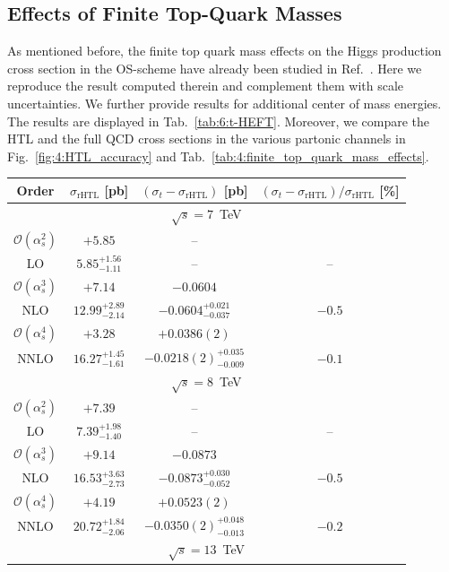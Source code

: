 \subsection{Effects of Finite Top-Quark Masses}
As mentioned before, the finite top quark mass effects on the Higgs production cross section in the \acs{OS}-scheme have already been studied in Ref.~\cite{Czakon:2021yub}. Here we reproduce the result computed therein and complement them with scale uncertainties. We further provide results for additional center of mass energies. The results are displayed in Tab.~\ref{tab:6:t-HEFT}. Moreover, we compare the \acs{HTL} and the full \acs{QCD} cross sections in the various partonic channels in Fig.~\ref{fig:4:HTL_accuracy} and Tab.~\ref{tab:4:finite_top_quark_mass_effects}.
\begin{table}[t]
\centering
\begin{tabular}{cccc}
Order  &  $\sigma_\text{rHTL}$ [pb] & $(\sigma_t - \sigma_\text{rHTL})$ [pb]  &  $(\sigma_t - \sigma_\text{rHTL})/\sigma_\text{rHTL}$ [\%]  \\
\hline
\hline
\multicolumn{4}{c}{$\sqrt{s}=7$~TeV}\\
\hline
$\mathcal{O}(\alpha_s^2)$ & $+5.85$ & -- &  \\
LO & $5.85^{+1.56}_{-1.11}$ & -- & --  \\
\hline
$\mathcal{O}(\alpha_s^3)$ & $+7.14$ & $-0.0604$ &  \\
NLO & $12.99^{+2.89}_{-2.14}$ & $-0.0604^{+0.021}_{-0.037}$ & $-0.5$  \\
\hline
$\mathcal{O}(\alpha_s^4)$ & $+3.28$ & $+0.0386(2)$ &  \\
NNLO & $16.27^{+1.45}_{-1.61}$ & $-0.0218(2)^{+0.035}_{-0.009}$ & $-0.1$  \\
\hline
\hline
\multicolumn{4}{c}{$\sqrt{s}=8$~TeV}\\
\hline
$\mathcal{O}(\alpha_s^2)$ & $+7.39$ & -- &  \\
LO & $7.39^{+1.98}_{-1.40}$ & -- & --  \\
\hline
$\mathcal{O}(\alpha_s^3)$ & $+9.14$ & $-0.0873$ &  \\
NLO & $16.53^{+3.63}_{-2.73}$ & $-0.0873^{+0.030}_{-0.052}$ & $-0.5$  \\
\hline
$\mathcal{O}(\alpha_s^4)$ & $+4.19$ & $+0.0523(2)$ &   \\
NNLO & $20.72^{+1.84}_{-2.06}$ & $-0.0350(2)^{+0.048}_{-0.013}$ & $-0.2$  \\
\hline
\hline
\multicolumn{4}{c}{$\sqrt{s}=13$~TeV}\\

\end{tabular}
\end{table}
